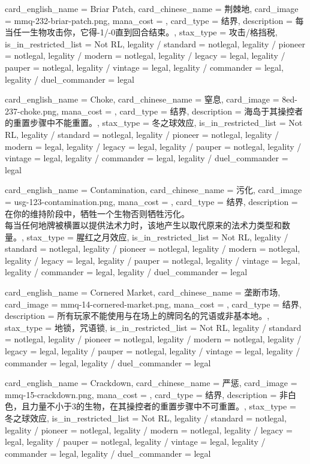 \documentclass[lang = cn, color = black, 10pt]{AllThatStax}
\begin{document}
\card
{
	card_english_name = {Briar Patch},
	card_chinese_name = {荆棘地},
	card_image = mmq-232-briar-patch.png,
	mana_cost = ,
	card_type = 结界,
	description = {每当任一生物攻击你，它得-1/-0直到回合结束。},
	stax_type = 攻击/格挡税,
	is_in_restricted_list = Not RL,
	legality / standard = notlegal,
	legality / pioneer = notlegal,
	legality / modern = notlegal,
	legality / legacy = legal,
	legality / pauper = notlegal,
	legality / vintage = legal,
	legality / commander = legal,
	legality / duel_commander = legal
}

\card
{
	card_english_name = {Choke},
	card_chinese_name = {窒息},
	card_image = 8ed-237-choke.png,
	mana_cost = ,
	card_type = 结界,
	description = {海岛于其操控者的重置步骤中不能重置。},
	stax_type = 冬之球效应,
	is_in_restricted_list = Not RL,
	legality / standard = notlegal,
	legality / pioneer = notlegal,
	legality / modern = legal,
	legality / legacy = legal,
	legality / pauper = notlegal,
	legality / vintage = legal,
	legality / commander = legal,
	legality / duel_commander = legal
}

\card
{
	card_english_name = {Contamination},
	card_chinese_name = {污化},
	card_image = usg-123-contamination.png,
	mana_cost = ,
	card_type = 结界,
	description = {在你的维持阶段中，牺牲一个生物否则牺牲污化。\\
每当任何地牌被横置以提供法术力时，该地产生以取代原来的法术力类型和数量。},
	stax_type = 腥红之月效应,
	is_in_restricted_list = Not RL,
	legality / standard = notlegal,
	legality / pioneer = notlegal,
	legality / modern = notlegal,
	legality / legacy = legal,
	legality / pauper = notlegal,
	legality / vintage = legal,
	legality / commander = legal,
	legality / duel_commander = legal
}

\card
{
	card_english_name = {Cornered Market},
	card_chinese_name = {垄断市场},
	card_image = mmq-14-cornered-market.png,
	mana_cost = ,
	card_type = 结界,
	description = {所有玩家不能使用与在场上的牌同名的咒语或非基本地。},
	stax_type = 地锁，咒语锁,
	is_in_restricted_list = Not RL,
	legality / standard = notlegal,
	legality / pioneer = notlegal,
	legality / modern = notlegal,
	legality / legacy = legal,
	legality / pauper = notlegal,
	legality / vintage = legal,
	legality / commander = legal,
	legality / duel_commander = legal
}

\card
{
	card_english_name = {Crackdown},
	card_chinese_name = {严惩},
	card_image = mmq-15-crackdown.png,
	mana_cost = ,
	card_type = 结界,
	description = {非白色，且力量不小于3的生物，在其操控者的重置步骤中不可重置。},
	stax_type = 冬之球效应,
	is_in_restricted_list = Not RL,
	legality / standard = notlegal,
	legality / pioneer = notlegal,
	legality / modern = notlegal,
	legality / legacy = legal,
	legality / pauper = notlegal,
	legality / vintage = legal,
	legality / commander = legal,
	legality / duel_commander = legal
}
\end{document}
